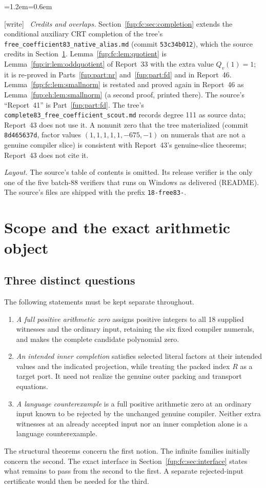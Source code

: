 \documentclass[11pt,letterpaper]{article}
\theoremstyle{definition}\newtheorem{definition}[theorem]{Definition}
\theoremstyle{remark}\newtheorem{remark}[theorem]{Remark}
\newcommand{\wtag}{\textup{[write]}}
\newenvironment{writenote}{\par\smallskip\begin{list}{}{\leftmargin=1.2em\rightmargin=0.6em}\item[]\small\wtag\ }{\end{list}\smallskip}
\newcommand{\rw}[1]{\nolinkurl{#1}}%
\begin{document}
\begin{writenote}
\emph{Credits and overlaps.} Section~\ref{fup:fc:sec:completion} extends the conditional auxiliary CRT completion of the tree's \rw{free_coefficient83_native_alias.md} (commit \texttt{53c34b012}), which the source credits in Section~\ref{fup:fc:sec:scope}. Lemma~\ref{fup:fc:lem:quotient} is Lemma~\ref{fup:ir:lem:oddquotient} of Report~33 with the extra value $Q_v(1)=1$; it is re-proved in Parts~\ref{fup:part:nr} and~\ref{fup:part:fd} and in Report~46. Lemma~\ref{fup:fc:lem:smallnorm} is restated and proved again in Report~46 as Lemma~\ref{fup:eh:lem:smallnorm} (a second proof, printed there). The source's ``Report~41'' is Part~\ref{fup:part:fd}. The tree's \rw{complete83_free_coefficient_scout.md} records degree 111 as source data; Report~43 does not use it. A nonunit zero that the tree materialized (commit \texttt{8d465637d}, factor values $(1,1,1,1,1,-675,-1)$ on numerals that are not a genuine compiler slice) is consistent with Report~43's genuine-slice theorems; Report~43 does not cite it.

\emph{Layout.} The source's table of contents is omitted. Its release verifier is the only one of the five batch-88 verifiers that runs on Windows as delivered (README). The source's files are shipped with the prefix \texttt{18-free83-}.
\end{writenote}

\section{Scope and the exact arithmetic object}
\label{fup:fc:sec:scope}
\subsection{Three distinct questions}
The following statements must be kept separate throughout.
\begin{enumerate}
\item \emph{A full positive arithmetic zero} assigns positive integers to all
18 supplied witnesses and the ordinary input, retaining the six fixed
compiler numerals, and makes the complete candidate polynomial zero.
\item \emph{An intended inner completion} satisfies selected literal
factors at their intended values and the indicated projection, while
treating the packed index $R$ as a target port. It need not realize the
genuine outer packing and transport equations.
\item \emph{A language counterexample} is a full positive arithmetic zero
at an ordinary input known to be rejected by the unchanged genuine
compiler. Neither extra witnesses at an already accepted input nor an
inner completion alone is a language counterexample.
\end{enumerate}
The structural theorems concern the first notion. The infinite families
initially concern the second. The exact interface in Section~\ref{fup:fc:sec:interface}
states what remains to pass from the second to the first. A separate
rejected-input certificate would then be needed for the third.
\end{document}
